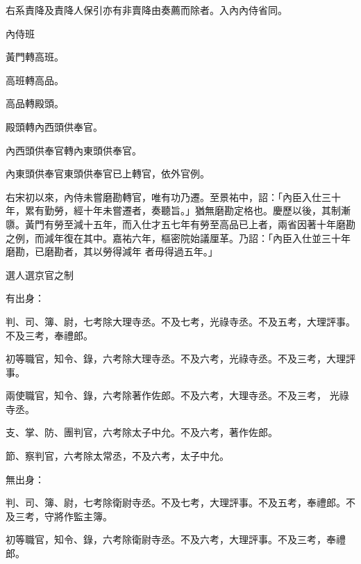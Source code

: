 \begin{pinyinscope}
 右系責降及責降人保引亦有非賣降由奏薦而除者。入內內侍省同。



 內侍班



 黃門轉高班。



 高班轉高品。



 高品轉殿頭。



 殿頭轉內西頭供奉官。



 內西頭供奉官轉內東頭供奉官。



 內東頭供奉官東頭供奉官已上轉官，依外官例。



 右宋初以來，內侍未嘗磨勘轉官，唯有功乃遷。至景祐中，詔：「內臣入仕三十年，累有勤勞，經十年未嘗遷者，奏聽旨。」猶無磨勘定格也。慶歷以後，其制漸隳。黃門有勞至減十五年，而入仕才五七年有勞至高品已上者，兩省因著十年磨勘之例，而減年復在其中。嘉祐六年，樞密院始議厘革。乃詔：「內臣入仕並三十年磨勘，已磨勘者，其以勞得減年
 者毋得過五年。」



 選人選京官之制



 有出身：



 判、司、簿、尉，七考除大理寺丞。不及七考，光祿寺丞。不及五考，大理評事。不及三考，奉禮郎。



 初等職官，知令、錄，六考除大理寺丞。不及六考，光祿寺丞。不及三考，大理評事。



 兩使職官，知令、錄，六考除著作佐郎。不及六考，大理寺丞。不及三考，
 光祿寺丞。



 支、掌、防、團判官，六考除太子中允。不及六考，著作佐郎。



 節、察判官，六考除太常丞，不及六考，太子中允。



 無出身：



 判、司、簿、尉，七考除衛尉寺丞。不及七考，大理評事。不及五考，奉禮郎。不及三考，守將作監主簿。



 初等職官，知令、錄，六考除衛尉寺丞。不及六考，大理評事。不及三考，奉禮郎。




\end{pinyinscope}
